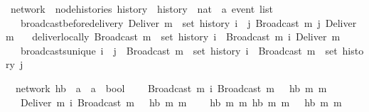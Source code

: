 \documentclass[acmlarge,review,anonymous]{acmart}\settopmatter{printfolios=true}
\begin{document}
\begin{isabellebody}
\isanewline
{}\isamarkupfalse%
\ network\ {\isacharequal}\ node{\isacharunderscore}histories\ history\ \ history\ {\isacharcolon}{\isacharcolon}\ {\isachardoublequoteopen}nat\ {\isasymRightarrow}\ {\isacharprime}a\ event\ list{\isachardoublequoteclose}\ {\isacharplus}\isanewline
\ \ \ broadcast{\isacharunderscore}before{\isacharunderscore}delivery{\isacharcolon}\ {\isachardoublequoteopen}Deliver\ m\ {\isasymin}\ set\ {\isacharparenleft}history\ i{\isacharparenright}\ {\isasymLongrightarrow}\ {\isasymexists}j{\isachardot}\ Broadcast\ m\ {\isasymsqsubset}\isactrlsup j\ Deliver\ m{\isachardoublequoteclose}\isanewline
\ \ \ deliver{\isacharunderscore}locally{\isacharcolon}\ {\isachardoublequoteopen}Broadcast\ m\ {\isasymin}\ set\ {\isacharparenleft}history\ i{\isacharparenright}\ {\isasymLongrightarrow}\ Broadcast\ m\ {\isasymsqsubset}\isactrlsup i\ Deliver\ m{\isachardoublequoteclose}\isanewline
\ \ \ broadcasts{\isacharunderscore}unique{\isacharcolon}\ {\isachardoublequoteopen}i\ {\isasymnoteq}\ j\ {\isasymLongrightarrow}\ Broadcast\ m\ {\isasymin}\ set\ {\isacharparenleft}history\ i{\isacharparenright}\ {\isasymLongrightarrow}\ Broadcast\ m\ {\isasymnotin}\ set\ {\isacharparenleft}history\ j{\isacharparenright}{\isachardoublequoteclose}\isanewline
\end{isabellebody}

\begin{isabellebody}
\isanewline
{}\isamarkupfalse%
\ {\isacharparenleft}\ network{\isacharparenright}\ hb\ {\isacharcolon}{\isacharcolon}\ {\isachardoublequoteopen}{\isacharprime}a\ {\isasymRightarrow}\ {\isacharprime}a\ {\isasymRightarrow}\ bool{\isachardoublequoteclose}\ \isanewline
\ \ {\isachardoublequoteopen}{\isasymlbrakk}\ Broadcast\ m{}\ {\isasymsqsubset}\isactrlsup i\ Broadcast\ m{}\ {\isasymrbrakk}\ {\isasymLongrightarrow}\ hb\ m{}\ m{}{\isachardoublequoteclose}\ {\isacharbar}\isanewline
\ \ {\isachardoublequoteopen}{\isasymlbrakk}\ Deliver\ m{}\ {\isasymsqsubset}\isactrlsup i\ Broadcast\ m{}\ {\isasymrbrakk}\ {\isasymLongrightarrow}\ hb\ m{}\ m{}{\isachardoublequoteclose}\ {\isacharbar}\isanewline
\ \ {\isachardoublequoteopen}{\isasymlbrakk}\ hb\ m{}\ m{}{\isacharsemicolon}\ hb\ m{}\ m{}\ {\isasymrbrakk}\ {\isasymLongrightarrow}\ hb\ m{}\ m{}{\isachardoublequoteclose}\isanewline
\ \ \isanewline
\end{isabellebody}
\end{document}
